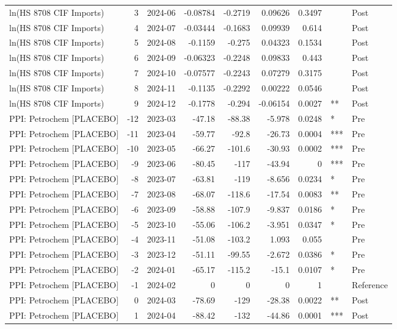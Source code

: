 \begin{table}
\begin{tabular}{lrlrrrrll}
ln(HS 8708 CIF Imports) & 3 & 2024-06 & -0.08784 & -0.2719 & 0.09626 & 0.3497 &  & Post \\
ln(HS 8708 CIF Imports) & 4 & 2024-07 & -0.03444 & -0.1683 & 0.09939 & 0.614 &  & Post \\
ln(HS 8708 CIF Imports) & 5 & 2024-08 & -0.1159 & -0.275 & 0.04323 & 0.1534 &  & Post \\
ln(HS 8708 CIF Imports) & 6 & 2024-09 & -0.06323 & -0.2248 & 0.09833 & 0.443 &  & Post \\
ln(HS 8708 CIF Imports) & 7 & 2024-10 & -0.07577 & -0.2243 & 0.07279 & 0.3175 &  & Post \\
ln(HS 8708 CIF Imports) & 8 & 2024-11 & -0.1135 & -0.2292 & 0.00222 & 0.0546 &  & Post \\
ln(HS 8708 CIF Imports) & 9 & 2024-12 & -0.1778 & -0.294 & -0.06154 & 0.0027 & ** & Post \\
PPI: Petrochem [PLACEBO] & -12 & 2023-03 & -47.18 & -88.38 & -5.978 & 0.0248 & * & Pre \\
PPI: Petrochem [PLACEBO] & -11 & 2023-04 & -59.77 & -92.8 & -26.73 & 0.0004 & *** & Pre \\
PPI: Petrochem [PLACEBO] & -10 & 2023-05 & -66.27 & -101.6 & -30.93 & 0.0002 & *** & Pre \\
PPI: Petrochem [PLACEBO] & -9 & 2023-06 & -80.45 & -117 & -43.94 & 0 & *** & Pre \\
PPI: Petrochem [PLACEBO] & -8 & 2023-07 & -63.81 & -119 & -8.656 & 0.0234 & * & Pre \\
PPI: Petrochem [PLACEBO] & -7 & 2023-08 & -68.07 & -118.6 & -17.54 & 0.0083 & ** & Pre \\
PPI: Petrochem [PLACEBO] & -6 & 2023-09 & -58.88 & -107.9 & -9.837 & 0.0186 & * & Pre \\
PPI: Petrochem [PLACEBO] & -5 & 2023-10 & -55.06 & -106.2 & -3.951 & 0.0347 & * & Pre \\
PPI: Petrochem [PLACEBO] & -4 & 2023-11 & -51.08 & -103.2 & 1.093 & 0.055 &  & Pre \\
PPI: Petrochem [PLACEBO] & -3 & 2023-12 & -51.11 & -99.55 & -2.672 & 0.0386 & * & Pre \\
PPI: Petrochem [PLACEBO] & -2 & 2024-01 & -65.17 & -115.2 & -15.1 & 0.0107 & * & Pre \\
PPI: Petrochem [PLACEBO] & -1 & 2024-02 & 0 & 0 & 0 & 1 &  & Reference \\
PPI: Petrochem [PLACEBO] & 0 & 2024-03 & -78.69 & -129 & -28.38 & 0.0022 & ** & Post \\
PPI: Petrochem [PLACEBO] & 1 & 2024-04 & -88.42 & -132 & -44.86 & 0.0001 & *** & Post \\

\end{tabular}
\end{table}
